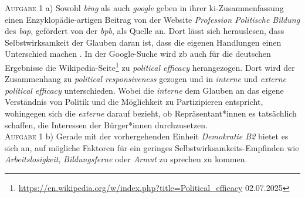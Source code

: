 \textsc{Aufgabe 1} a) \quad
Sowohl \emph{bing} als auch \emph{google} geben in ihrer \gls{ki}-Zusammenfassung einen Enzyklopädie-artigen Beitrag von der Website \emph{Profession Politische Bildung} des \emph{\gls{bap}}, gefördert von der \emph{\gls{bpb}}, als Quelle an. Dort lässt sich herauslesen, dass Selbstwirksamkeit der Glauben daran ist, dass die eigenen Handlungen einen Unterschied machen \autocite[]{Hufer.2022}. In der Google-Suche wird \gls{zb} auch für die deutschen Ergebnisse die Wikipedia-Seite\footnote{
    \url{https://en.wikipedia.org/w/index.php?title=Political_efficacy} 02.07.2025} 
zu \emph{political efficacy} herangezogen. Dort wird der Zusammenhang zu \emph{political responsiveness} gezogen und in \emph{interne} und \emph{externe} \emph{political efficacy} unterschieden. Wobei die \emph{interne} dem Glauben an das eigene Verständnis von Politik und die Möglichkeit zu Partizipieren entspricht, wohingegen sich die \emph{externe} darauf bezieht, ob Repräsentant*innen es tatsächlich schaffen, die Interessen der Bürger*innen durchzusetzen. 
\\

\textsc{Aufgabe 1} b) \quad
Gerade mit der vorhergehenden Einheit \emph{Demokratie B2} bietet es sich an, auf mögliche Faktoren für ein geringes Selbstwirksamkeits-Empfinden wie \emph{Arbeitslosigkeit}, \emph{Bildungsferne} oder \emph{Armut} zu sprechen zu kommen. 
\\

